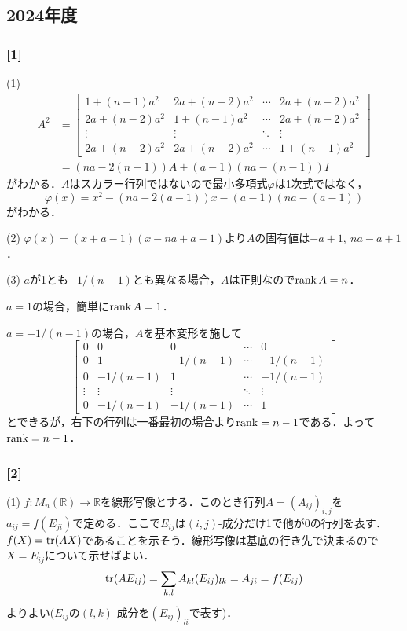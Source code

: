 \documentclass[a4j]{ltjsarticle}
\newcommand{\Rset}{\mathbb{R}}
\newcommand{\1}{\mathbbm{1}}
\numberwithin{equation}{section}
\theoremstyle{definition}
\begin{document}
\subsection{2024年度}
\subsubsection*{[1]}
(1) 
\begin{align}
    A^2&=\begin{bmatrix}
        1+(n-1)a^2 & 2a+(n-2)a^2 & \cdots & 2a+(n-2)a^2 \\ 
        2a+(n-2)a^2 & 1+(n-1)a^2 & \cdots & 2a+(n-2)a^2 \\
        \vdots & \vdots & \ddots & \vdots \\
        2a+(n-2)a^2 & 2a+(n-2)a^2 & \cdots & 1+(n-1)a^2
    \end{bmatrix}\\
    &=(na-2(n-1))A+(a-1)(na-(n-1))I
\end{align}
がわかる．$A$はスカラー行列ではないので最小多項式$\varphi$は1次式ではなく，
\begin{equation}
    \varphi(x)=x^2-(na-2(a-1))x-(a-1)(na-(a-1))
\end{equation}
がわかる．

(2) $\varphi(x)=(x+a-1)(x-na+a-1)$より$A$の固有値は$-a+1,\ na-a+1$．

(3) $a$が1とも$-1/(n-1)$とも異なる場合，$A$は正則なので$\rank A=n$．

$a=1$の場合，簡単に$\rank A=1$．

$a=-1/(n-1)$の場合，$A$を基本変形を施して
\begin{equation}
    \begin{bmatrix}
        0 & 0 & 0 & \cdots & 0 \\
        0 & 1 & -1/(n-1) & \cdots & -1/(n-1) \\
        0 & -1/(n-1) & 1 & \cdots & -1/(n-1) \\
        \vdots & \vdots & \vdots & \ddots & \vdots \\
        0 & -1/(n-1) & -1/(n-1) & \cdots & 1
    \end{bmatrix}
\end{equation}
とできるが，右下の行列は一番最初の場合より$\rank=n-1$である．よって$\rank=n-1$．

\subsubsection*{[2]}
(1) $f\colon M_n(\Rset)\to\Rset$を線形写像とする．このとき行列$A=(A_{ij})_{i,j}$を$a_{ij}=f(E_{ji})$で定める．ここで$E_{ij}$は$(i,j)$-成分だけ1で他が0の行列を表す．$f(X)=\tr(AX)$であることを示そう．線形写像は基底の行き先で決まるので$X=E_{ij}$について示せばよい．
\begin{equation}
    \tr(AE_{ij})=\sum_{k,l}A_{kl}(E_{ij})_{lk}=A_{ji}=f(E_{ij})
\end{equation}
よりよい($E_{ij}$の$(l,k)$-成分を$(E_{ij})_{li}$で表す)．
\end{document}
